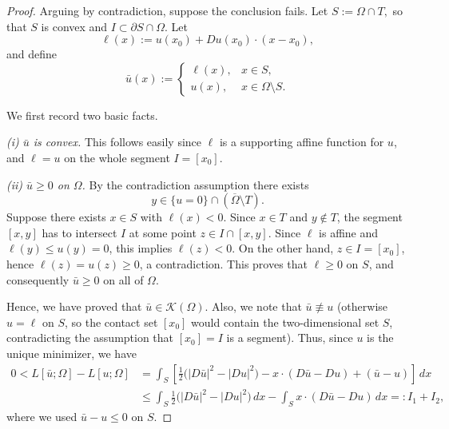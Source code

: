 \documentclass[reqno,11pt]{amsart}
\numberwithin{equation}{section}
\theoremstyle{remark}
\begin{document}
\begin{proof}
Arguing by contradiction, suppose the conclusion fails. Let
$S:=\Omega\cap T,$
so that $S$ is convex and $I\subset \partial S\cap\Omega$. Let
\[
\ell(x):=u(x_0)+Du(x_0)\cdot (x-x_0),
\]
and define
\[
\bar u(x):=
\begin{cases}
\ell(x), & x\in S,\\[1mm]
u(x), & x\in\Omega\setminus S.
\end{cases}
\]

We first record two basic facts.

\smallskip
\noindent\emph{(i) $\bar u$ is convex.}
This follows easily since $\ell$ is a supporting affine function for $u$, and $\ell=u$ on the whole segment $I=[x_0]$.

\smallskip
\noindent\emph{(ii) $\bar u\ge0$ on $\Omega$.}
By the contradiction assumption there exists
\[
y\in \{u=0\}\cap(\overline\Omega\setminus T).
\]
Suppose there exists $x\in S$ with $\ell(x)<0$. Since
$x\in T$ and $y\notin T$, the segment $[x,y]$ has to intersect $I$ at some point 
$z\in I\cap[x,y]$. Since $\ell$ is affine and $\ell(y)\le u(y)=0$, this implies $\ell(z)<0$. On the other hand, $z\in I=[x_0]$, hence $\ell(z)=u(z)\ge0$, a contradiction. This proves that
$\ell\ge0$ on $S$, and consequently $\bar u\ge0$ on all of $\Omega$.

\smallskip
Hence, we have proved that $\bar u\in\mathcal K(\Omega)$. Also, we note that $\bar u\not\equiv u$ (otherwise $u=\ell$ on $S$, so the contact set $[x_0]$ would contain the
two-dimensional set $S$, contradicting the assumption that $[x_0]=I$ is a
segment). Thus, since $u$ is the unique minimizer, we have
\begin{align}
0< L[\bar u;\Omega]-L[u;\Omega]
&= \int_{S}\left[\frac12\bigl(|D\bar u|^2-|Du|^2\bigr)-x\cdot(D\bar u-Du)+(\bar u-u)\right]\,dx \nonumber\\
&\le \int_{S}\frac12\bigl(|D\bar u|^2-|Du|^2\bigr)\,dx - \int_{S}x\cdot(D\bar u-Du)\,dx =: I_1+I_2, \label{bar-u-vari}
\end{align}
where we used $\bar u-u\le0$ on $S$.


\end{proof}
\end{document}

